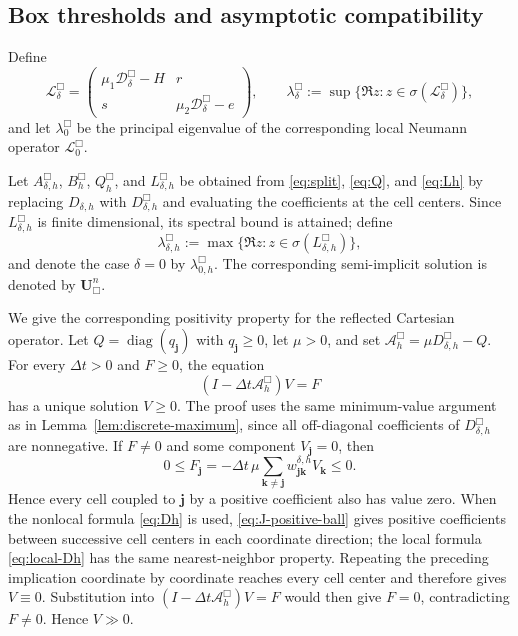 \documentclass[11pt]{article}
\theoremstyle{definition}
\newcommand{\cD}{\mathcal{D}}
\newcommand{\cL}{\mathcal{L}}
\newcommand{\diag}{\operatorname{diag}}
\newcommand{\U}{\bm U}
\newcommand{\jj}{\bm j}
\newcommand{\kk}{\bm k}
\begin{document}
\subsection{Box thresholds and asymptotic compatibility}

Define
\[
 \cL_\delta^{\Box}
 =
 \begin{pmatrix}
 \mu_1\cD_\delta^{\Box}-H&r\\
 s&\mu_2\cD_\delta^{\Box}-e
 \end{pmatrix},
 \qquad
 \lambda_\delta^{\Box}
 :=
 \sup\{\Re z:z\in\sigma(\cL_\delta^{\Box})\},
\]
and let $\lambda_0^{\Box}$ be the principal eigenvalue of the corresponding local Neumann operator $\cL_0^{\Box}$.

Let $A_{\delta,h}^{\Box}$, $B_h^{\Box}$, $Q_h^{\Box}$, and $L_{\delta,h}^{\Box}$ be obtained from \eqref{eq:split}, \eqref{eq:Q}, and \eqref{eq:Lh} by replacing $D_{\delta,h}$ with $D_{\delta,h}^{\Box}$ and evaluating the coefficients at the cell centers.  Since $L_{\delta,h}^{\Box}$ is finite dimensional, its spectral bound is attained; define
\[
 \lambda_{\delta,h}^{\Box}
 :=
 \max\{\Re z:z\in\sigma(L_{\delta,h}^{\Box})\},
\]
and denote the case $\delta=0$ by $\lambda_{0,h}^{\Box}$.  The corresponding semi-implicit solution is denoted by $\U_{\Box}^n$.

We give the corresponding positivity property for the reflected Cartesian
operator.  Let
$Q=\diag(q_{\jj})$ with $q_{\jj}\ge0$, let $\mu>0$, and set
$\mathcal A_h^{\Box}=\mu D_{\delta,h}^{\Box}-Q$.  For every $\Delta t>0$ and
$F\ge0$, the equation
\[
 (I-\Delta t\mathcal A_h^{\Box})V=F
\]
has a unique solution $V\ge0$.  The proof uses the same minimum-value argument as in Lemma~\ref{lem:discrete-maximum}, since all off-diagonal coefficients of
$D_{\delta,h}^{\Box}$ are nonnegative.  If $F\ne0$ and some component
$V_{\jj}=0$, then
\[
 0\le F_{\jj}
 =-\Delta t\,\mu
   \sum_{\kk\ne\jj}w_{\jj\kk}^{\delta,h}V_{\kk}
 \le0.
\]
Hence every cell coupled to $\jj$ by a positive coefficient also has value
zero.  When the nonlocal formula \eqref{eq:Dh} is used,
\eqref{eq:J-positive-ball} gives positive coefficients between successive cell
centers in each coordinate direction; the local formula \eqref{eq:local-Dh}
has the same nearest-neighbor property.  Repeating the preceding implication coordinate by coordinate reaches every
cell center and therefore gives $V\equiv0$.  Substitution into
$(I-\Delta t\mathcal A_h^{\Box})V=F$ would then give $F=0$, contradicting
$F\ne0$.  Hence $V\gg0$.
\end{document}
